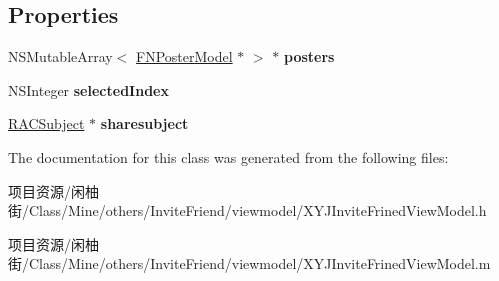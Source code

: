 \subsection*{Properties}
\begin{DoxyCompactItemize}
\item 
\mbox{\label{interface_x_y_j_invite_frined_view_model_ad08343475445d4864cd8a4e8e7b79c60}} 
N\+S\+Mutable\+Array$<$ \mbox{\hyperlink{interface_f_n_poster_model}{F\+N\+Poster\+Model}} $\ast$ $>$ $\ast$ {\bfseries posters}
\item 
\mbox{\label{interface_x_y_j_invite_frined_view_model_a03161731703d5b99cbd2df28b9cf41d2}} 
N\+S\+Integer {\bfseries selected\+Index}
\item 
\mbox{\label{interface_x_y_j_invite_frined_view_model_a7c378665aec15e4bb7ee2c7822751f5f}} 
\mbox{\hyperlink{interface_r_a_c_subject}{R\+A\+C\+Subject}} $\ast$ {\bfseries sharesubject}
\end{DoxyCompactItemize}


The documentation for this class was generated from the following files\+:\begin{DoxyCompactItemize}
\item 
项目资源/闲柚街/\+Class/\+Mine/others/\+Invite\+Friend/viewmodel/X\+Y\+J\+Invite\+Frined\+View\+Model.\+h\item 
项目资源/闲柚街/\+Class/\+Mine/others/\+Invite\+Friend/viewmodel/X\+Y\+J\+Invite\+Frined\+View\+Model.\+m\end{DoxyCompactItemize}
